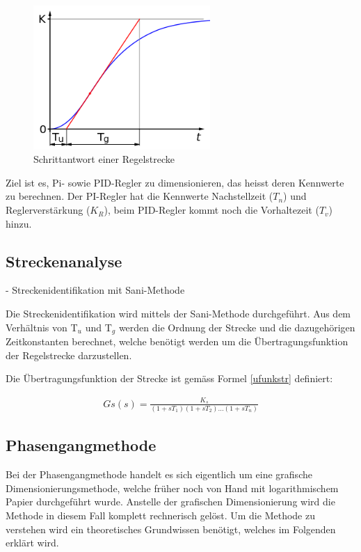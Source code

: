 \begin{figure}[h]
\centering
\includegraphics[width=0.6\textwidth]{Schrittantwort.png}
\caption{Schrittantwort einer Regelstrecke}
\label{schrittantwort}
\end{figure}

Ziel ist es, Pi- sowie PID-Regler zu dimensionieren, das heisst deren Kennwerte zu berechnen. Der PI-Regler hat die Kennwerte Nachstellzeit ($T_n$) und Reglerverstärkung ($K_R$), beim PID-Regler kommt noch die Vorhaltezeit ($T_v$) hinzu.



\subsection{Streckenanalyse}
- Streckenidentifikation mit Sani-Methode \newline

Die Streckenidentifikation wird mittels der Sani-Methode durchgeführt. Aus dem Verhältnis von T$_u$ und T$_g$ werden die Ordnung der Strecke und die dazugehörigen Zeitkonstanten berechnet, welche benötigt werden um die Übertragungsfunktion der Regelstrecke darzustellen. \newline 


Die Übertragungsfunktion der Strecke ist gemäss Formel \ref{ufunkstr} definiert:

\begin{align}
Gs(s)=\frac{K_s}{(1+sT_1)(1+sT_2)...(1+sT_n)}
\label{ufunkstr}
\end{align}

\newpage
\subsection{Phasengangmethode}
Bei der Phasengangmethode handelt es sich eigentlich um eine grafische Dimensionierungsmethode, welche früher noch von Hand mit logarithmischem Papier durchgeführt wurde. Anstelle der grafischen Dimensionierung wird die Methode in diesem Fall komplett rechnerisch gelöst. Um die Methode zu verstehen wird ein theoretisches Grundwissen benötigt, welches im Folgenden erklärt wird.


